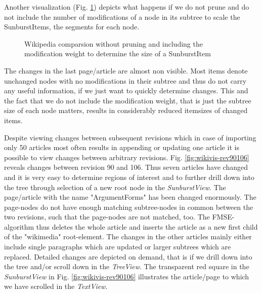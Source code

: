 Another visualization (Fig. \ref{fig:wikivis-without-modscale}) depicts what happens if we do not prune and do not include the number of modifications of a node in its subtree to scale the SunburstItems, the segments for each node.

\begin{figure}[tb]
\caption{\label{fig:wikivis-without-modscale} Wikipedia comparsion without pruning and including the modification weight to determine the size of a SunburstItem}
\end{figure}

The changes in the last page/article are almost non visible. Most items denote unchanged nodes with no modifications in their subtree and thus do not carry any useful information, if we just want to quickly determine changes. This and the fact that we do not include the modification weight, that is just the subtree size of each node matters, results in considerably reduced itemsizes of changed items.

Despite viewing changes between subsequent revisions which in case of importing only 50 articles most often results in appending or updating one article it is possible to view changes between arbitrary revisions. Fig. \ref{fig:wikivis-rev90106} reveals changes between revision 90 and 106. Thus seven articles have changed and it is very easy to determine regions of interest and to further drill down into the tree through selection of a new root node in the \emph{SunburstView}. The page/article with the name "ArgumentForms" has been changed enormously. The page-nodes do not have enough matching subtree-nodes in common between the two revisions, such that the page-nodes are not matched, too. The FMSE-algorithm thus deletes the whole article and inserts the article as a new first child of the "wikimedia" root-element. The changes in the other articles mainly either include single paragraphs which are updated or larger subtrees which are replaced. Detailed changes are depicted on demand, that is if we drill down into the tree and/or scroll down in the \emph{TreeView}. The transparent red square in the \emph{SunburstView} in Fig. \ref{fig:wikivis-rev90106} illustrates the article/page to which we have scrolled in the \emph{TextView}.

